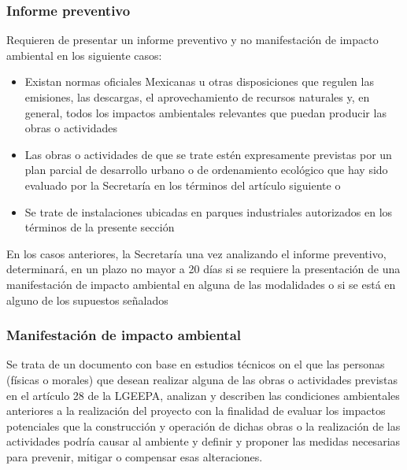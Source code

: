 \subsubsection{Informe preventivo}
Requieren de presentar un informe preventivo y no manifestación de impacto ambiental en los siguiente casos:
\begin{itemize}
    \item Existan normas oficiales Mexicanas u otras disposiciones que regulen las emisiones, las descargas, el aprovechamiento de recursos naturales y, en general, todos los impactos ambientales relevantes que puedan producir las obras o actividades
    \item Las obras o actividades de que se trate estén expresamente previstas por un plan parcial de desarrollo urbano o de ordenamiento ecológico que hay sido evaluado por la Secretaría en los términos del artículo siguiente o
    \item Se trate de instalaciones ubicadas en parques industriales autorizados en los términos de la presente sección
\end{itemize}
En los casos anteriores, la Secretaría una vez analizando el informe preventivo, determinará, en un plazo no mayor a 20 días si se requiere la presentación de una manifestación de impacto ambiental en alguna de las modalidades o si se está en alguno de los supuestos señalados

\subsubsection{Manifestación de impacto ambiental} 

Se trata de un documento con base en estudios técnicos on el que las personas (físicas o morales) que desean realizar alguna de las obras o actividades previstas en el artículo 28 de la LGEEPA, analizan y describen las condiciones ambientales anteriores a la realización del proyecto con la finalidad de evaluar los impactos potenciales que la construcción y operación de dichas obras o la realización de las actividades podría causar al ambiente y definir y proponer las medidas necesarias para prevenir, mitigar o compensar esas alteraciones.

